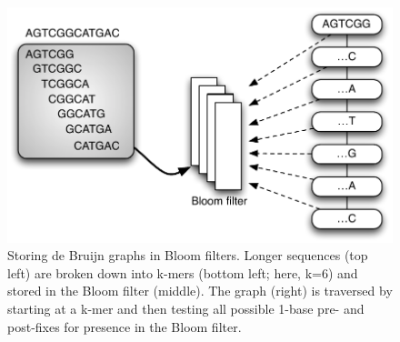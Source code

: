 \documentclass{pnastwo}
\begin{document}
\begin{figure}
\centering
\includegraphics[width=5in]{bloomgraph}
\caption{Storing de Bruijn graphs in Bloom filters.  Longer sequences (top left) are broken down into k-mers (bottom left; here, k=6) and stored in the Bloom filter (middle).
The graph (right) is traversed by starting at a k-mer and then testing all possible 1-base pre- and post-fixes for presence in the Bloom filter.}

\label{fig:bloomgraph}
\end{figure}

\clearpage
\end{document}
